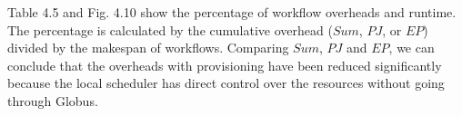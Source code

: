 Table 4.5 and Fig. 4.10 show the percentage of workflow overheads and runtime. The percentage is calculated by the cumulative overhead ($Sum$, $PJ$, or $EP$) divided by the makespan of workflows. Comparing $Sum$, $PJ$ and $EP$, we can conclude that the overheads with provisioning have been reduced significantly because the local scheduler has direct control over the resources without going through Globus. 


